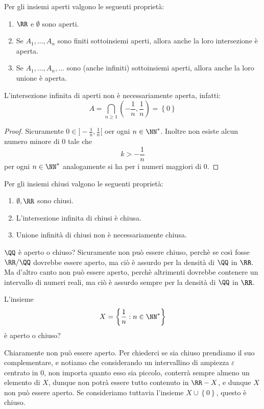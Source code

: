 \documentclass[11pt]{scrartcl}
\begin{document}
	\begin{lemma}
		Per gli insiemi aperti valgono le seguenti proprietà:
		\begin{enumerate}
			\item $\RR$ e $\emptyset$ sono aperti.
			\item Se $A_1,\dots,A_n$ sono finiti sottoinsiemi aperti, allora anche la loro intersezione è aperta.
			\item Se $A_1,\dots,A_n,\dots$ sono (anche infiniti) sottoinsiemi aperti, allora anche la loro unione è aperta.
		\end{enumerate}
	\end{lemma} 
	\begin{remark}
		L'intersezione infinita di aperti non è necessariamente aperta, infatti:
		$$A=\bigcap_{n\ge 1}\left(-\frac{1}{n},\frac{1}{n}\right)=\left\{0\right\}$$
	\end{remark}
	\begin{proof}
		Sicuramente $0\in ]-\frac{1}{n},\frac{1}{n}[$ oer ogni $n\in\NN^*$. Inoltre non esiste alcun numero minore di $0$ tale che
		$$k>-\frac{1}{n}$$
		per ogni $n\in\NN^*$ analogamente si ha per i numeri maggiori di $0$.	
	\end{proof}
	
	\begin{lemma}
		Per gli insiemi chiusi valgono le seguenti proprietà:
		\begin{enumerate}
			\item $\emptyset,\RR$ sono chiusi.
			\item L'intersezione infinita di chiusi è chiusa.
			\item Unione infinità di chiusi non è necessariamente chiusa.
		\end{enumerate}
	\end{lemma}
	
	$\QQ$ è aperto o chiuso? Sicuramente non può essere chiuso, perchè se così fosse $\RR/\QQ$ dovrebbe essere aperto, ma ciò è assurdo per la densità di $\QQ$ in $\RR$. Ma d'altro canto non può essere aperto, perchè altrimenti dovrebbe contenere un intervallo di numeri reali, ma ciò è assurdo sempre per la densità di $\QQ$ in $\RR$.
	
	\begin{example}
		L'insieme 
		$$X=\left\{\frac{1}{n}:n\in\NN^*\right\}$$
		è aperto o chiuso?
	\end{example}
	Chiaramente non può essere aperto. Per chiederci se sia chiuso prendiamo il suo complementare, e notiamo che considerando un intervallino di ampiezza $\varepsilon$ centrato in $0$, non importa quanto esso sia piccolo, conterrà sempre almeno un elemento di $X$, dunque non potrà essere tutto contenuto in $\RR-X$, e dunque $X$ non può essere aperto. Se consideriamo tuttavia l'insieme $X\cup\left\{0\right\}$, questo è chiuso.
	
\end{document}
